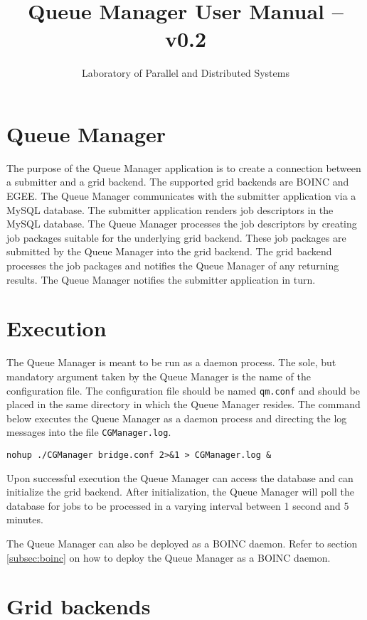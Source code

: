 \documentclass[a4paper, 12pt]{article}
\title{Queue Manager User Manual -- v0.2}
\author{Laboratory of Parallel and Distributed Systems}
\date{}
\begin{document}
 
\pagestyle{empty}
\maketitle
\thispagestyle{empty}

\section{Queue Manager}

The purpose of the Queue Manager application is to create a connection between a submitter and a grid backend. The supported grid backends are BOINC and EGEE. The Queue Manager communicates with the submitter application via a MySQL database. The submitter application renders job descriptors in the MySQL database. The Queue Manager processes the job descriptors by creating job packages suitable for the underlying grid backend. These job packages are submitted by the Queue Manager into the grid backend. The grid backend processes the job packages and notifies the Queue Manager of any returning results. The Queue Manager notifies the submitter application in turn.

\section{Execution}
The Queue Manager is meant to be run as a daemon process. The sole, but mandatory argument taken by the Queue Manager is the name of the configuration file. The configuration file should be named {\tt qm.conf} and should be placed in the same directory in which the Queue Manager resides. The command below executes the Queue Manager as a daemon process and directing the log messages into the file {\tt CGManager.log}.
\begin{verbatim}
nohup ./CGManager bridge.conf 2>&1 > CGManager.log &
\end{verbatim}
Upon successful execution the Queue Manager can access the database and can initialize the grid backend. After initialization, the Queue Manager will poll the database for jobs to be processed in a varying interval between 1 second and 5 minutes.

The Queue Manager can also be deployed as a BOINC daemon. Refer to section \ref{subsec:boinc} on how to deploy the Queue Manager as a BOINC daemon. 

\section{Grid backends}
\end{document}

